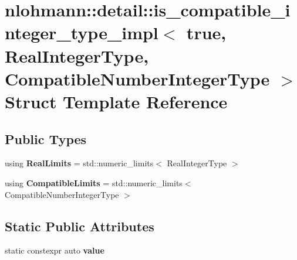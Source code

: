 \hypertarget{structnlohmann_1_1detail_1_1is__compatible__integer__type__impl_3_01true_00_01RealIntegerType_0064332c4ada80cab3523aebd66ccc012a}{}\section{nlohmann\+:\+:detail\+:\+:is\+\_\+compatible\+\_\+integer\+\_\+type\+\_\+impl$<$ true, Real\+Integer\+Type, Compatible\+Number\+Integer\+Type $>$ Struct Template Reference}
\label{structnlohmann_1_1detail_1_1is__compatible__integer__type__impl_3_01true_00_01RealIntegerType_0064332c4ada80cab3523aebd66ccc012a}
\subsection*{Public Types}
\begin{DoxyCompactItemize}
\item 
\mbox{\label{structnlohmann_1_1detail_1_1is__compatible__integer__type__impl_3_01true_00_01RealIntegerType_0064332c4ada80cab3523aebd66ccc012a_a1bad172320cd124997a3d68990f50a75}} 
using {\bfseries Real\+Limits} = std\+::numeric\+\_\+limits$<$ Real\+Integer\+Type $>$
\item 
\mbox{\label{structnlohmann_1_1detail_1_1is__compatible__integer__type__impl_3_01true_00_01RealIntegerType_0064332c4ada80cab3523aebd66ccc012a_a3bf8ee2f76e74f997258c9ba40c64bc4}} 
using {\bfseries Compatible\+Limits} = std\+::numeric\+\_\+limits$<$ Compatible\+Number\+Integer\+Type $>$
\end{DoxyCompactItemize}
\subsection*{Static Public Attributes}
\begin{DoxyCompactItemize}
\item 
static constexpr auto {\bfseries value}
\end{DoxyCompactItemize}


